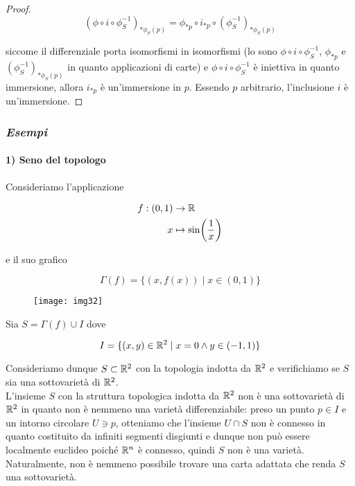 \begin{proof}
	\begin{equation}
		(\phi \circ i \circ \phi_{S}^{-1})_{*\phi_{S}(p)} = \phi_{*p} \circ i_{*p} \circ (\phi_{S}^{-1})_{*\phi_{S}(p)}
	\end{equation}

	siccome il differenziale porta isomorfismi in isomorfismi (lo sono $ \phi \circ i \circ \phi_{S}^{-1} $, $ \phi_{*p} $ e $ (\phi_{S}^{-1})_{*\phi_{S}(p)} $ in quanto applicazioni di carte) e $ \phi \circ i \circ \phi_{S}^{-1} $ è iniettiva in quanto immersione, allora $ i_{*p} $ è un'immersione in $ p $. Essendo $ p $ arbitrario, l'inclusione $ i $ è un'immersione.
\end{proof}

\subsubsection{\textit{Esempi}}

\paragraph{1) Seno del topologo}

Consideriamo l'applicazione

\begin{align}
	\begin{split}
		f : (0,1) &\to \mathbb{R}\\
		x &\mapsto \sin(\dfrac{1}{x})
	\end{split}
\end{align}

e il suo grafico

\begin{equation}
	\Gamma(f) = \{ (x,f(x)) \mid x \in (0,1) \}
\end{equation}

\begin{figure}[H]
	\centering
	\texttt{[image: img32]}
\end{figure}

Sia $ S = \Gamma(f) \cup I $ dove

\begin{equation}
	I = \{ (x,y) \in \mathbb{R}^{2} \mid x=0 \wedge y \in (-1,1) \}
\end{equation}

Consideriamo dunque $ S \subset \mathbb{R}^{2} $ con la topologia indotta da $ \mathbb{R}^{2} $ e verifichiamo se $ S $ sia una sottovarietà di $ \mathbb{R}^{2} $.\\
L'insieme $ S $ con la struttura topologica indotta da $ \mathbb{R}^{2} $ non è una sottovarietà di $ \mathbb{R}^{2} $ in quanto non è nemmeno una varietà differenziabile: preso un punto $ p \in I $ e un intorno circolare $ U \ni p $, otteniamo che l'insieme $ U \cap S $ non è connesso in quanto costituito da infiniti segmenti disgiunti e dunque non può essere localmente euclideo poiché $ \mathbb{R}^{n} $ è connesso, quindi $ S $ non è una varietà.\\
Naturalmente, non è nemmeno possibile trovare una carta adattata che renda $ S $ una sottovarietà.

